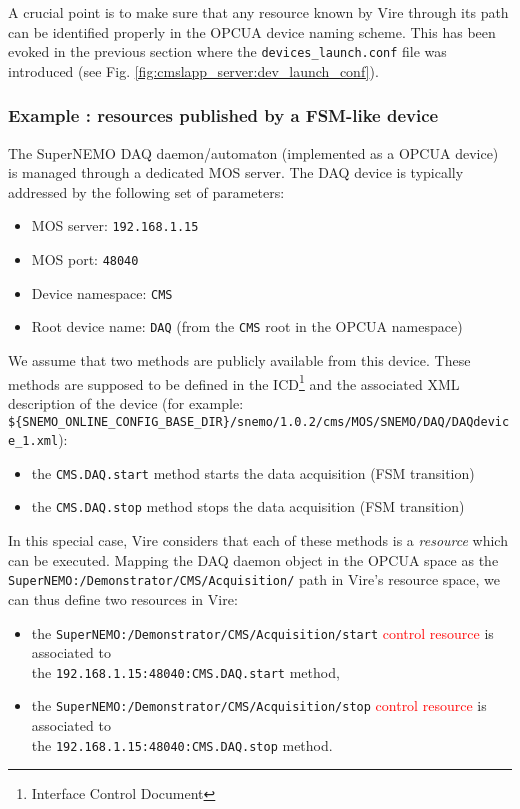 A  crucial point  is to  make  sure that  any resource  known by  Vire
through its path can be identified properly in the OPCUA device naming
scheme.   This has  been  evoked  in the  previous  section where  the
\texttt{devices\_launch.conf}     file     was     introduced     (see
Fig. \ref{fig:cmslapp_server:dev_launch_conf}).

\subsubsection{Example : resources published by a FSM-like device}

The SuperNEMO DAQ daemon/automaton (implemented  as a OPCUA device) is
managed through a  dedicated MOS server.  The DAQ  device is typically addressed
by the following set of parameters:

\begin{itemize}
\item MOS server: \texttt{192.168.1.15}
\item MOS port: \texttt{48040}
\item Device namespace: \texttt{CMS}
\item Root device name: \texttt{DAQ} (from the \texttt{CMS} root in the OPCUA namespace)
\end{itemize}

\noindent We assume that two  methods are publicly available from this
device.   These  methods   are   supposed  to   be   defined  in   the
ICD\footnote{Interface  Control  Document}   and  the  associated  XML
description of the device (for example: \\
\verb|${SNEMO_ONLINE_CONFIG_BASE_DIR}/snemo/1.0.2/cms/MOS/SNEMO/DAQ/DAQdevice_1.xml|):
\begin{itemize}

\item the \texttt{CMS.DAQ.start} method starts the data acquisition (FSM transition)

\item the \texttt{CMS.DAQ.stop} method stops the data acquisition (FSM transition)

\end{itemize}

\noindent In this special case, Vire considers that each of these methods is a \emph{resource}
which can be executed.
Mapping the DAQ daemon object in the OPCUA space as the
\verb|SuperNEMO:/Demonstrator/CMS/Acquisition/| path in Vire's resource space, we can thus define
two resources in Vire:
\begin{itemize}
\item     the    \verb|SuperNEMO:/Demonstrator/CMS/Acquisition/start|
  \textcolor{red}{control   resource}   is   associated  to   \\   the
  \texttt{192.168.1.15:48040:CMS.DAQ.start} method,
\item     the     \verb|SuperNEMO:/Demonstrator/CMS/Acquisition/stop|
  \textcolor{red}{control   resource}   is   associated  to   \\   the
  \texttt{192.168.1.15:48040:CMS.DAQ.stop} method.
\end{itemize}

